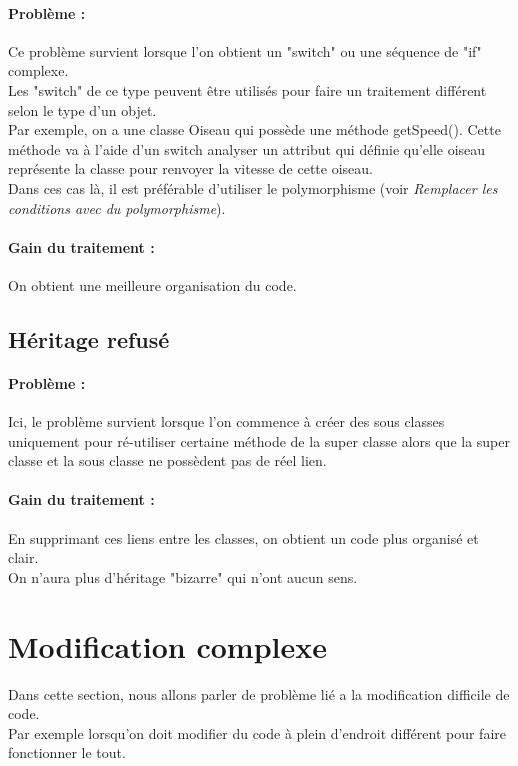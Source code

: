 \documentclass[a4paper,twoside,12pt,openright]{report}
\begin{document}
\paragraph{Problème :}
Ce problème survient lorsque l'on obtient un "switch" ou une séquence de "if" complexe.\\
Les "switch" de ce type peuvent être utilisés pour faire un traitement différent selon le type d'un objet.\\
Par exemple, on a une classe Oiseau qui possède une méthode getSpeed(). Cette méthode va à l'aide d'un switch analyser un attribut qui définie qu'elle oiseau représente la classe pour renvoyer la vitesse de cette oiseau.\\
Dans ces cas là, il est préférable d'utiliser le polymorphisme (voir \textit{Remplacer les conditions avec du polymorphisme}).

\paragraph{Gain du traitement :}
On obtient une meilleure organisation du code.\\

\subsection{Héritage refusé}
\paragraph{Problème :}
Ici, le problème survient lorsque l'on commence à créer des sous classes uniquement pour ré-utiliser certaine méthode de la super classe alors que la super classe et la sous classe ne possèdent pas de réel lien.\\


\paragraph{Gain du traitement :}
En supprimant ces liens entre les classes, on obtient  un code plus organisé et clair.\\
On n'aura plus d'héritage "bizarre" qui n'ont aucun sens.\\

\section{Modification complexe}
Dans cette section, nous allons parler de problème lié a la modification difficile de code.\\
Par exemple lorsqu'on doit modifier du code à plein d'endroit différent pour faire fonctionner le tout.\\
\end{document}
